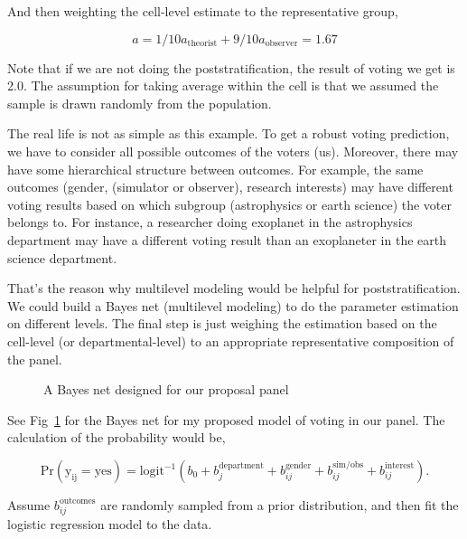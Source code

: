 \documentclass[12pt,letterpaper]{article}
\begin{document}
And then weighting the cell-level estimate to the representative group, 

\begin{equation*}
    a = 1 / 10 a_{\mathrm{theorist}} + 9 / 10 a_{\mathrm{observer}} = 1.67
\end{equation*}

Note that if we are not doing the poststratification, the result of voting we get is 2.0.
The assumption for taking average within the cell is that we assumed the sample is drawn randomly from the population.

The real life is not as simple as this example. 
To get a robust voting prediction, we have to consider all possible outcomes of the voters (us).
Moreover, there may have some hierarchical structure between outcomes. 
For example, the same outcomes (gender, (simulator or observer), research interests) may have different voting results based on which subgroup (astrophysics or earth science) the voter belongs to.
For instance, a researcher doing exoplanet in the astrophysics department may have a different voting result than an exoplaneter in the earth science department.

That's the reason why multilevel modeling would be helpful for poststratification. 
We could build a Bayes net (multilevel modeling) to do the parameter estimation on different levels.
The final step is just weighing the estimation based on the cell-level (or departmental-level) to an appropriate representative composition of the panel.

\begin{figure}
    \begin{center}
                
    \end{center}
    \caption{A Bayes net designed for our proposal panel}
    \label{fig:bayes_net_mrp}
\end{figure}

See Fig~\ref{fig:bayes_net_mrp} for the Bayes net for my proposed model of voting in our panel.
The calculation of the probability would be, 

\begin{equation}
    \mathrm{Pr(y_{ij} = yes)} = \mathrm{logit^{-1}}(
        b_0 + b_j^{\mathrm{department}} + b_{ij}^{\mathrm{gender}}
        + b_{ij}^{\mathrm{sim/obs}} + b_{ij}^{\mathrm{interest}}
    ).
\end{equation}

Assume $b_{ij}^{\mathrm{outcomes}}$ are randomly sampled from a prior distribution,
and then fit the logistic regression model to the data.
\end{document}
